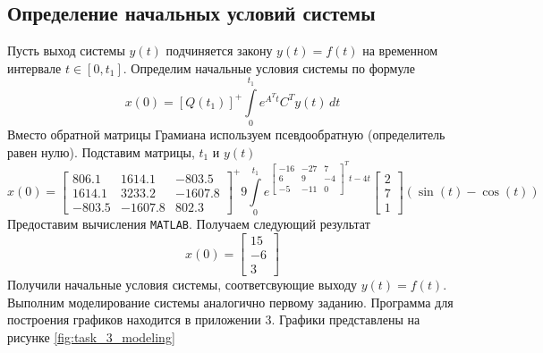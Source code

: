 \documentclass[a4paper, 12pt]{article}
\begin{document}
    \subsection{Определение начальных условий системы}
    Пусть выход системы $y(t)$ подчиняется закону $y(t)=f(t)$ на временном интервале $t\in\left[0,t_1\right]$.
    Определим начальные условия системы по формуле
    $$
    x(0)=\left[Q(t_1)\right]^+\int\limits_{0}^{t_1}e^{A^Tt}C^Ty(t)\,dt
    $$
    Вместо обратной матрицы Грамиана используем псевдообратную (определитель равен нулю).
    Подставим матрицы, $t_1$ и $y(t)$
    $$
    x(0)=\begin{bmatrix}
        806.1	&1614.1	&-803.5\\
        1614.1	 &3233.2	&-1607.8\\
        -803.5	 &-1607.8	&802.3 
    \end{bmatrix}^+9\int\limits_{0}^{t_1}e^{\begin{bmatrix}
        -16 &-27 &7\\
        6 &9 &-4\\
        -5 &-11 &0
    \end{bmatrix}^Tt-4t}\begin{bmatrix}
        2\\ 7\\ 1
    \end{bmatrix}\left(\sin{(t)}-\cos{(t)}\right)
    $$
    Предоставим вычисления \texttt{MATLAB}. Получаем следующий результат
    $$
    x(0)=\begin{bmatrix}
    15\\
   -6\\
    3
    \end{bmatrix}
    $$
    Получили начальные условия системы, соответсвующие выходу $y(t)=f(t)$. Выполним моделирование системы аналогично первому заданию.
    Программа для построения графиков находится в приложении 3. Графики представлены на рисунке \ref{fig:task_3_modeling}
\end{document}
